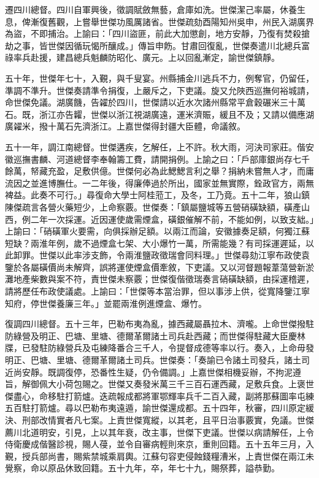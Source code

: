 \begin{pinyinscope}
遷四川總督。四川自軍興後，徵調賦斂無藝，倉庫如洗。世傑潔己率屬，休養生息，俾漸復舊觀，上嘗舉世傑功風厲諸省。世傑疏劾酉陽知州吳申，州民入湖廣界為盜，不即捕治。上諭曰：「四川盜匪，前此大加懲創，地方安靜，乃復有焚殺搶劫之事，皆世傑因循玩愒所釀成。」傳旨申飭。甘肅回復亂，世傑奏遣川北總兵富祿率兵赴援，建昌總兵魁麟防昭化、廣元。上以回亂漸定，諭世傑鎮靜。

五十年，世傑年七十，入覲，與千叟宴。州縣捕金川逃兵不力，例奪官，仍留任，準調不準升。世傑奏請準令捐復，上嚴斥之，下吏議。旋又允陜西巡撫何裕城請，命世傑免議。湖廣饑，告糴於四川，世傑請以近水次諸州縣常平倉穀碾米三十萬石。既，浙江亦告糶，世傑以浙江視湖廣遠，運米濟賑，緩且不及；又請以備應湖廣糴米，撥十萬石先濟浙江。上嘉世傑得封疆大臣體，命議敘。

五十一年，調江南總督。世傑遘疾，乞解任，上不許。秋大雨，河決司家莊。偕安徽巡撫書麟、河道總督李奉翰籌工費，請開捐例。上諭之曰：「戶部庫銀尚存七千餘萬，帑藏充盈，足敷供億。世傑何必為此鰓鰓言利之舉？捐納未嘗無人才，而庸流因之並進博膴仕。一二年後，得廉俸過於所出，國家並無實際，銓政官方，兩無裨益。此奏不可行。」尋復命大學士阿桂蒞工，及冬，工乃竟。五十二年，狼山鎮陳傑疏言各營火藥短少，上命察覈。世傑奏：「鎮屬鹽城等五營硝磺缺額，磺產山西，例二年一次採運。近因運使歲需煙盒，磺銀催解不前，不能如例，以致支絀。」上諭曰：「硝磺軍火要需，向俱採辦足額。以兩江而論，安徽據奏足額，何獨江蘇短缺？兩淮年例，歲不過煙盒七架、大小爆竹一萬，所需能幾？有司採運遲延，以此卸罪。世傑以此率涉支飾，令兩淮鹽政徵瑞會同料理。」世傑尋劾江寧布政使袁鑒於各屬磺價尚未解齊，誤將運使煙盒價牽敘，下吏議。又以河督題報葦蕩營新淤灘地產柴數與案不符，責世傑未察覈；世傑復偕徵瑞奏言硝磺缺額，由採運稽遲，請將歷任布政使議處。上諭曰：「世傑等本當治罪，但以事涉上供，從寬降鑒江寧知府，停世傑養廉三年。」並罷兩淮例進煙盒、爆竹。

復調四川總督。五十三年，巴勒布夷為亂，據西藏屬聶拉木、濟嚨。上命世傑撥駐防綠營及明正、巴塘、里塘、德爾革爾諸土司兵赴西藏；而世傑得駐藏大臣慶林牒，已發駐防綠營兵及屯練降番合三千人，令提督成德等率以行。奏入，上命毋發明正、巴塘、里塘、德爾革爾諸土司兵。世傑奏：「奏諭已令諸土司發兵，諸土司近尚安靜。既調復停，恐番性生疑，仍令備調。」上嘉世傑相機妥辦，不拘泥遵旨，解御佩大小荷包賜之。世傑又奏發米萬三千三百石運西藏，足敷兵食。上褒世傑盡心，命移駐打箭爐。迭疏報成都將軍鄂輝率兵千二百入藏，副將那蘇圖率屯練五百駐打箭爐。尋以巴勒布夷遠遁，諭世傑還成都。五十四年，秋審，四川原定緩決、刑部改情實者凡七案。上責世傑寬縱，以其老，且平日治事覈實，免議。世傑薦川北道明安，引見，上以其年衰，改主事，世傑下吏議。世傑以病請解任，上令侍衛慶成偕醫診視，賜人葠，並令自審病輕則來京，重則回籍。五十五年三月，入覲，授兵部尚書，賜紫禁城乘肩輿。江蘇句容吏侵蝕錢糧漕米，上責世傑在兩江未覺察，命以原品休致回籍。五十九年，卒，年七十九，賜祭葬，謚恭勤。


\end{pinyinscope}
